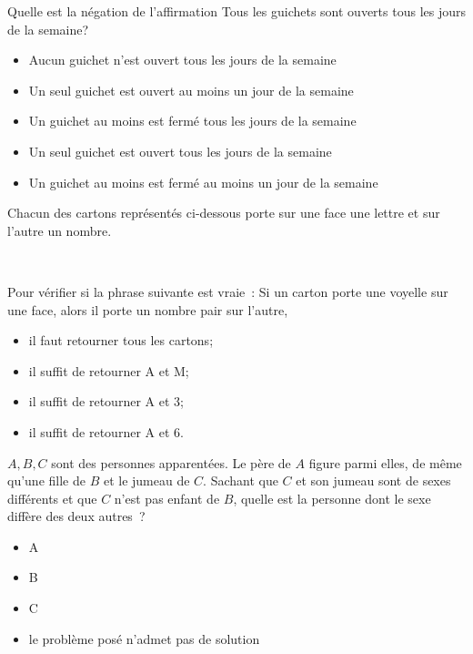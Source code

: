 \documentclass[12pt,french,oneside,a4paper]{memoir} %
\begin{document}
\begin{exo}
Quelle est la négation de l'affirmation \og Tous les guichets sont
ouverts tous les jours de la semaine\fg{}?

\begin{itemize}
\item Aucun guichet n'est ouvert tous les jours de la semaine
\item Un seul guichet est ouvert au moins un jour de la semaine
\item Un guichet au moins est fermé tous les jours de la semaine
\item Un seul guichet est ouvert tous les jours de la semaine
\item Un guichet au moins est fermé au moins un jour de la semaine
\end{itemize}
\end{exo}

\begin{exo}
Chacun des cartons représentés ci-dessous porte sur une face une
lettre et sur l'autre un nombre. 
\begin{center}
~~ \hfill {} \hfill {} \hfill {} \hfill {} \hfill ~~~
\end{center}
Pour vérifier si la phrase suivante est vraie~: \og Si un carton porte une
voyelle sur une face, alors il porte un nombre pair sur l'autre\fg{},

\begin{itemize}
\item il faut retourner tous les cartons;
\item il suffit de retourner A et M;
\item il suffit de retourner A et 3;
\item il suffit de retourner A et 6.
\end{itemize}
\end{exo}

\begin{exo}
$A,B,C$ sont des personnes apparentées. Le père de $A$ figure parmi
elles, de même qu'une fille de $B$ et le jumeau de $C$. Sachant que $C$ et son
jumeau sont de sexes différents et que $C$ n'est pas enfant de $B$, quelle est la
personne dont le sexe diffère des deux autres~?
\begin{itemize}
\item A
\item B
\item C
\item le problème posé n'admet pas de solution
\end{itemize}
\end{exo}
\end{document}
